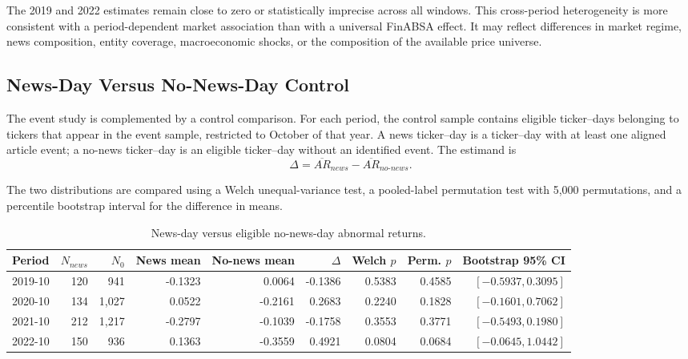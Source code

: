 \documentclass[12pt,a4paper]{article}
\begin{document}
The 2019 and 2022 estimates remain close to zero or statistically imprecise across all windows. This cross-period heterogeneity is more consistent with a period-dependent market association than with a universal FinABSA effect. It may reflect differences in market regime, news composition, entity coverage, macroeconomic shocks, or the composition of the available price universe.

\subsection{News-Day Versus No-News-Day Control}
\label{subsec:news-control-multi-year}

The event study is complemented by a control comparison. For each period, the control sample contains eligible ticker--days belonging to tickers that appear in the event sample, restricted to October of that year. A news ticker--day is a ticker--day with at least one aligned article event; a no-news ticker--day is an eligible ticker--day without an identified event. The estimand is
\begin{equation}
 \Delta=\overline{AR}_{news}-\overline{AR}_{no\text{-}news}.
\end{equation}

The two distributions are compared using a Welch unequal-variance test, a pooled-label permutation test with 5,000 permutations, and a percentile bootstrap interval for the difference in means.

\begin{table}[htbp]
\centering
\scriptsize
\caption{News-day versus eligible no-news-day abnormal returns.}
\label{tab:news-control-multi-year}
\begin{tabular}{lrrrrrrrr}
\toprule
\textbf{Period} & \textbf{$N_{news}$} & \textbf{$N_{0}$} & \textbf{News mean} & \textbf{No-news mean} & \textbf{$\Delta$} & \textbf{Welch $p$} & \textbf{Perm. $p$} & \textbf{Bootstrap 95\% CI} \\
\midrule
2019-10 & 120 & 941 & -0.1323 & 0.0064 & -0.1386 & 0.5383 & 0.4585 & $[-0.5937,0.3095]$ \\
2020-10 & 134 & 1,027 & 0.0522 & -0.2161 & 0.2683 & 0.2240 & 0.1828 & $[-0.1601,0.7062]$ \\
2021-10 & 212 & 1,217 & -0.2797 & -0.1039 & -0.1758 & 0.3553 & 0.3771 & $[-0.5493,0.1980]$ \\
2022-10 & 150 & 936 & 0.1363 & -0.3559 & 0.4921 & 0.0804 & 0.0684 & $[-0.0645,1.0442]$ \\
\bottomrule
\end{tabular}
\end{table}
\end{document}
